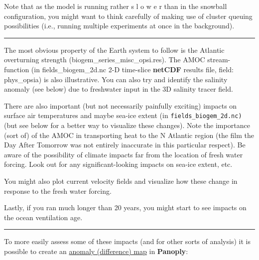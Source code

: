 Note that as the model is running rather s l o w e r than in the snowball configuration, you might want to think carefully of making use of cluster queuing possibilities (i.e., running multiple experiments at once in the background).

\vspace{1mm}\noindent\rule{4cm}{0.5pt}\vspace{2mm}

\noindent The most obvious property of the Earth system to follow is the Atlantic overturning strength (\textsf{\footnotesize biogem\_series\_misc\_opsi.res}). The AMOC stream-function (in \textsf{\footnotesize fields\_biogem\_2d.nc} 2-D time-slice \textbf{netCDF} results file, field: \textsf{\footnotesize phys\_opsia}) is also illustrative. You can also try and identify the salinity anomaly (see below) due to freshwater input in the 3D salinity tracer field.

There are also important (but not necessarily painfully exciting) impacts on surface air temperatures and maybe sea-ice extent (in \texttt{fields\_biogem\_2d.nc)} (but see below for a better way to visualize these changes). Note the importance (sort of) of the AMOC in transporting heat to the N Atlantic region (the film the Day After Tomorrow was not entirely inaccurate in this particular respect). Be aware of the possibility of climate impacts far from the location of fresh water forcing. Look out for any significant-looking impacts on sea-ice extent, etc.

You might also plot current velocity fields and visualize how these change in response to the fresh water forcing.

Lastly, if you ran much longer than 20 years, you might start to see impacts on the ocean ventilation age.

\vspace{1mm}\noindent\rule{4cm}{0.5pt}\vspace{2mm}

\newpage

\noindent To more easily assess some of these impacts (and for other sorts of analysis) it is possible to create an \uline{anomaly (difference) map} in \textbf{Panoply}:

